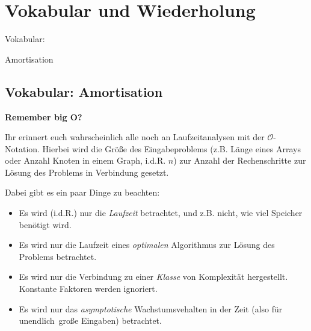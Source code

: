 \documentclass{beamer}
\begin{document}
\section{Vokabular und Wiederholung}
\begin{frame}
\Large
\begin{center}
Vokabular:\pause

Amortisation
\end{center}
\normalsize
\end{frame}

\subsection{Vokabular: Amortisation}

\begin{frame}
\textbf{Remember big O?}
\bigskip

Ihr erinnert euch wahrscheinlich alle noch an Laufzeitanalysen mit der $\mathcal{O}$-Notation.
Hierbei wird die Größe des Eingabeproblems (z.B. Länge eines Arrays oder Anzahl Knoten in einem Graph, i.d.R. $n$) zur Anzahl der Rechenschritte zur Lösung des Problems in Verbindung gesetzt.
\pause
\bigskip

Dabei gibt es ein paar Dinge zu beachten:\pause

\begin{itemize}
\item Es wird (i.d.R.) nur die \emph{Laufzeit} betrachtet, und z.B. nicht, wie viel Speicher benötigt wird.\pause
\item Es wird nur die Laufzeit eines \emph{optimalen} Algorithmus zur Lösung des Problems betrachtet.\pause
\item Es wird nur die Verbindung zu einer \emph{Klasse} von Komplexität hergestellt. Konstante Faktoren werden ignoriert.\pause
\item Es wird nur das \emph{asymptotische} Wachstumsvehalten in der Zeit (also für \glqq unendlich\grqq\ große Eingaben) betrachtet.
\end{itemize}
\end{frame}

\end{document}
